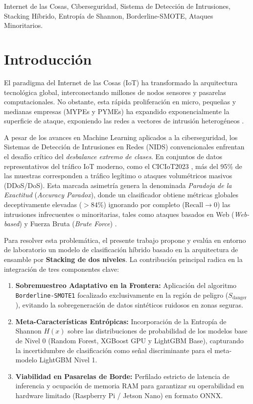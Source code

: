 \documentclass[conference]{IEEEtran}
\begin{document}
\begin{IEEEkeywords}
Internet de las Cosas, Ciberseguridad, Sistema de Detección de Intrusiones, Stacking Híbrido, Entropía de Shannon, Borderline-SMOTE, Ataques Minoritarios.
\end{IEEEkeywords}

\section{Introducción}
El paradigma del Internet de las Cosas (IoT) ha transformado la arquitectura tecnológica global, interconectando millones de nodos sensores y pasarelas computacionales. No obstante, esta rápida proliferación en micro, pequeñas y medianas empresas (MYPEs y PYMEs) ha expandido exponencialmente la superficie de ataque, exponiendo las redes a vectores de intrusión heterogéneos \cite{Sahoo2023}.

A pesar de los avances en Machine Learning aplicados a la ciberseguridad, los Sistemas de Detección de Intrusiones en Redes (NIDS) convencionales enfrentan el desafío crítico del \textit{desbalance extremo de clases}. En conjuntos de datos representativos del tráfico IoT moderno, como el CICIoT2023 \cite{Neto2023}, más del 95\% de las muestras corresponden a tráfico legítimo o ataques volumétricos masivos (DDoS/DoS). Esta marcada asimetría genera la denominada \textit{Paradoja de la Exactitud} (\textit{Accuracy Paradox}), donde un clasificador obtiene métricas globales deceptivamente elevadas ($>84\%$) ignorando por completo ($\mathrm{Recall} \to 0$) las intrusiones infrecuentes o minoritarias, tales como ataques basados en Web (\textit{Web-based}) y Fuerza Bruta (\textit{Brute Force}) \cite{Ferrag2022}.

Para resolver esta problemática, el presente trabajo propone y evalúa en entorno de laboratorio un modelo de clasificación híbrido basado en la arquitectura de ensamble por \textbf{Stacking de dos niveles}. La contribución principal radica en la integración de tres componentes clave:
\begin{enumerate}
    \item \textbf{Sobremuestreo Adaptativo en la Frontera:} Aplicación del algoritmo \texttt{Borderline-SMOTE1} focalizado exclusivamente en la región de peligro ($S_{\mathrm{danger}}$), evitando la sobregeneración de datos sintéticos ruidosos en zonas seguras.
    \item \textbf{Meta-Características Entrópicas:} Incorporación de la Entropía de Shannon $H(x)$ sobre las distribuciones de probabilidad de los modelos base de Nivel 0 (Random Forest, XGBoost GPU y LightGBM Base), capturando la incertidumbre de clasificación como señal discriminante para el meta-modelo LightGBM Nivel 1.
    \item \textbf{Viabilidad en Pasarelas de Borde:} Perfilado estricto de latencia de inferencia y ocupación de memoria RAM para garantizar su operabilidad en hardware limitado (Raspberry Pi / Jetson Nano) en formato ONNX.
\end{enumerate}
\end{document}
